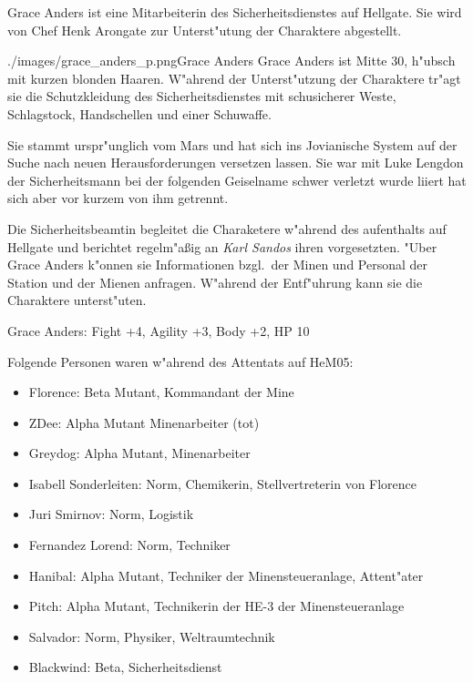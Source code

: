 \newpage
{}

Grace Anders ist eine Mitarbeiterin des Sicherheitsdienstes auf Hellgate. Sie wird von Chef Henk Arongate zur 
Unterst"utung der Charaktere abgestellt. 

\begin{sideimagebox}[l]{0.5}{./images/grace_anders_p.png}{Grace Anders}
    Grace Anders ist Mitte 30, h"ubsch mit kurzen blonden Haaren. W"ahrend der Unterst"utzung der Charaktere tr"agt sie 
    die Schutzkleidung des Sicherheitsdienstes mit schu\3sicherer Weste, Schlagstock, Handschellen und einer Schu\3waffe. 

    Sie stammt urspr"unglich vom Mars und hat sich ins Jovianische System auf der Suche nach neuen Herausforderungen 
    versetzen lassen. Sie war mit Luke Lengdon der Sicherheitsmann bei der folgenden Geiselname schwer verletzt wurde 
    liiert hat sich aber vor kurzem von ihm getrennt.

    Die Sicherheitsbeamtin begleitet die Charaketere w"ahrend des aufenthalts auf Hellgate und berichtet regelm"aßig an 
    \emph{Karl Sandos} ihren vorgesetzten. "Uber Grace Anders k"onnen sie Informationen bzgl.~der Minen und Personal der 
    Station und der Mienen anfragen. W"ahrend der Entf"uhrung kann sie die Charaktere unterst"uten.
\end{sideimagebox}

Grace Anders: Fight +4, Agility +3, Body +2, HP 10


Folgende Personen waren w"ahrend des Attentats auf HeM05:

\begin{itemize}
    \item Florence: Beta Mutant, Kommandant der Mine    
    \item ZDee: Alpha Mutant Minenarbeiter (tot)
    \item Greydog: Alpha Mutant, Minenarbeiter
    \item Isabell Sonderleiten: Norm, Chemikerin, Stellvertreterin von Florence
    \item Juri Smirnov: Norm, Logistik
    \item Fernandez Lorend: Norm, Techniker
    \item Hanibal: Alpha Mutant, Techniker der Minensteueranlage, Attent"ater
    \item Pitch: Alpha Mutant, Technikerin der HE-3 der Minensteueranlage
    \item Salvador: Norm, Physiker, Weltraumtechnik
    \item Blackwind: Beta, Sicherheitsdienst
\end{itemize}

